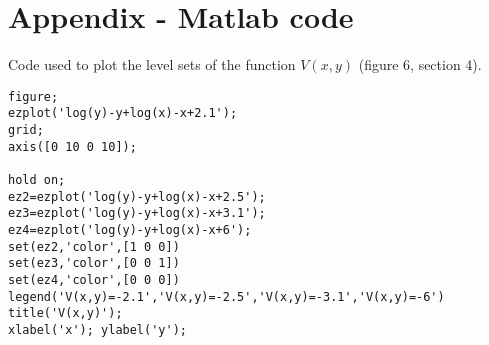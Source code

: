 \section*{Appendix - Matlab code}
Code used to plot the level sets of the function $V(x,y)$ (figure 6, section 4).
\begin{lstlisting}
figure;
ezplot('log(y)-y+log(x)-x+2.1');
grid;
axis([0 10 0 10]);

hold on;
ez2=ezplot('log(y)-y+log(x)-x+2.5');
ez3=ezplot('log(y)-y+log(x)-x+3.1');
ez4=ezplot('log(y)-y+log(x)-x+6');
set(ez2,'color',[1 0 0])
set(ez3,'color',[0 0 1])
set(ez4,'color',[0 0 0])
legend('V(x,y)=-2.1','V(x,y)=-2.5','V(x,y)=-3.1','V(x,y)=-6')
title('V(x,y)');
xlabel('x'); ylabel('y');
\end{lstlisting}
